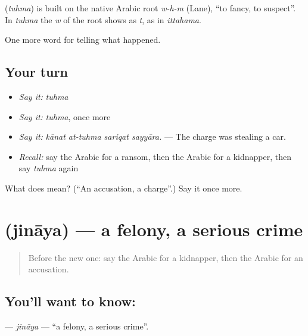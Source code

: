 \begin{cousinweb}
\textbf{} (\emph{tuhma}) is built on the native Arabic root \emph{w-h-m} (Lane), \textquotedblleft{}to fancy, to suspect\textquotedblright{}. In \emph{tuhma} the \emph{w} of the root shows as \emph{t}, as in \emph{ittahama}.
\end{cousinweb}

\begin{grammarlens}[title={What you've built}]
One more word for telling what happened.
\end{grammarlens}

\subsection*{Your turn}
\begin{itemize}
\raggedright
  \item \emph{Say it:} \emph{tuhma}
  \item \emph{Say it:} \emph{tuhma}, once more
  \item \emph{Say it:} \emph{kānat at-tuhma sariqat sayyāra.} — The charge was stealing a car.
  \item \emph{Recall:} say the Arabic for a ransom, then the Arabic for a kidnapper, then say \emph{tuhma} again
\end{itemize}

\begin{tcolorbox}[breakable,colback=teal!4,colframe=teal!35!black,title={Before you move on}]
What does  mean? (\textquotedblleft{}An accusation, a charge\textquotedblright{}.) Say it once more.
\end{tcolorbox}
\section[\texorpdfstring{\ar{جناية} (jināya)}{جناية (jināya)}]{ (jināya) — a felony, a serious crime}

\label{lesson:AR-C348-jinaya}



\begin{quote}
Before the new one: say the Arabic for a kidnapper, then the Arabic for an accusation.
\end{quote}

\subsection*{You'll want to know: }
\textbf{} — \emph{jināya} — \textquotedblleft{}a felony, a serious crime\textquotedblright{}.

